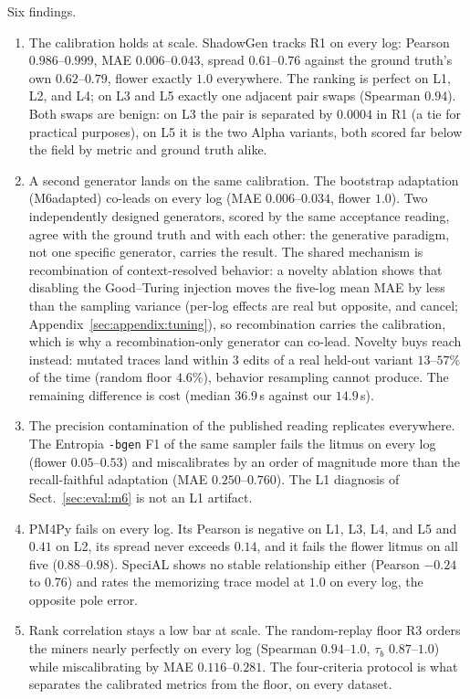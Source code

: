 \documentclass[runningheads]{llncs}
\begin{document}
Six findings.
\begin{enumerate}
  \item The calibration holds at scale. ShadowGen tracks R1 on every log: Pearson $0.986$--$0.999$, MAE $0.006$--$0.043$, spread $0.61$--$0.76$ against the ground truth's own $0.62$--$0.79$, flower exactly $1.0$ everywhere. The ranking is perfect on L1, L2, and L4; on L3 and L5 exactly one adjacent pair swaps (Spearman $0.94$). Both swaps are benign: on L3 the pair is separated by $0.0004$ in R1 (a tie for practical purposes), on L5 it is the two Alpha variants, both scored far below the field by metric and ground truth alike.
  \item A second generator lands on the same calibration. The bootstrap adaptation (M6adapted) co-leads on every log (MAE $0.006$--$0.034$, flower $1.0$). Two independently designed generators, scored by the same acceptance reading, agree with the ground truth and with each other: the generative paradigm, not one specific generator, carries the result. The shared mechanism is recombination of context-resolved behavior: a novelty ablation shows that disabling the Good--Turing injection moves the five-log mean MAE by less than the sampling variance (per-log effects are real but opposite, and cancel; Appendix~\ref{sec:appendix:tuning}), so recombination carries the calibration, which is why a recombination-only generator can co-lead. Novelty buys reach instead: mutated traces land within $3$ edits of a real held-out variant $13$--$57\%$ of the time (random floor $4.6\%$), behavior resampling cannot produce. The remaining difference is cost (median $36.9$\,s against our $14.9$\,s).
  \item The precision contamination of the published reading replicates everywhere. The Entropia \texttt{-bgen} F1 of the same sampler fails the litmus on every log (flower $0.05$--$0.53$) and miscalibrates by an order of magnitude more than the recall-faithful adaptation (MAE $0.250$--$0.760$). The L1 diagnosis of Sect.~\ref{sec:eval:m6} is not an L1 artifact.
  \item PM4Py fails on every log. Its Pearson is negative on L1, L3, L4, and L5 and $0.41$ on L2, its spread never exceeds $0.14$, and it fails the flower litmus on all five ($0.88$--$0.98$). SpeciAL shows no stable relationship either (Pearson $-0.24$ to $0.76$) and rates the memorizing trace model at $1.0$ on every log, the opposite pole error.
  \item Rank correlation stays a low bar at scale. The random-replay floor R3 orders the miners nearly perfectly on every log (Spearman $0.94$--$1.0$, $\tau_b$ $0.87$--$1.0$) while miscalibrating by MAE $0.116$--$0.281$. The four-criteria protocol is what separates the calibrated metrics from the floor, on every dataset.

\end{enumerate}
\end{document}
